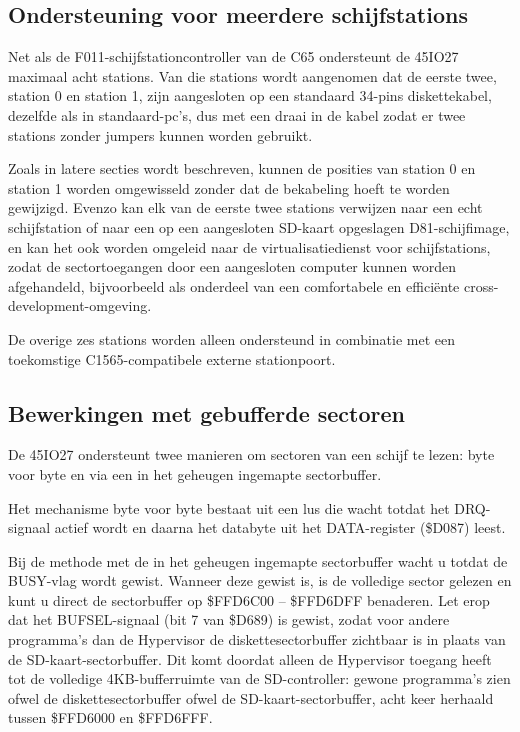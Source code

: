 \subsection{Ondersteuning voor meerdere schijfstations}

Net als de F011-schijfstationcontroller van de C65 ondersteunt de 45IO27 maximaal acht stations. Van die stations wordt aangenomen dat de eerste twee, station 0 en station 1, zijn aangesloten op een standaard 34-pins diskettekabel, dezelfde als in standaard-pc's, dus met een draai in de kabel zodat er twee stations zonder jumpers kunnen worden gebruikt.

Zoals in latere secties wordt beschreven, kunnen de posities van station 0 en station 1 worden omgewisseld zonder dat de bekabeling hoeft te worden gewijzigd. Evenzo kan elk van de eerste twee stations verwijzen naar een echt schijfstation of naar een op een aangesloten SD-kaart opgeslagen D81-schijfimage, en kan het ook worden omgeleid naar de virtualisatiedienst voor schijfstations, zodat de sectortoegangen door een aangesloten computer kunnen worden afgehandeld, bijvoorbeeld als onderdeel van een comfortabele en efficiënte cross-development-omgeving.

De overige zes stations worden alleen ondersteund in combinatie met een toekomstige C1565-compatibele externe stationpoort.

\subsection{Bewerkingen met gebufferde sectoren}
\label{subsec:reading-from-disks-and-buffer-management}

De 45IO27 ondersteunt twee manieren om sectoren van een schijf te lezen: byte voor byte en via een in het geheugen ingemapte sectorbuffer.

Het mechanisme byte voor byte bestaat uit een lus die wacht totdat het DRQ-signaal actief wordt en daarna het databyte uit het DATA-register (\$D087) leest.

Bij de methode met de in het geheugen ingemapte sectorbuffer wacht u totdat de BUSY-vlag wordt gewist. Wanneer deze gewist is, is de volledige sector gelezen en kunt u direct de sectorbuffer op \$FFD6C00 -- \$FFD6DFF benaderen. Let erop dat het BUFSEL-signaal (bit 7 van \$D689) is gewist, zodat voor andere programma's dan de Hypervisor de diskettesectorbuffer zichtbaar is in plaats van de SD-kaart-sectorbuffer. Dit komt doordat alleen de Hypervisor toegang heeft tot de volledige 4KB-bufferruimte van de SD-controller: gewone programma's zien ofwel de diskettesectorbuffer ofwel de SD-kaart-sectorbuffer, acht keer herhaald tussen \$FFD6000 en \$FFD6FFF.

